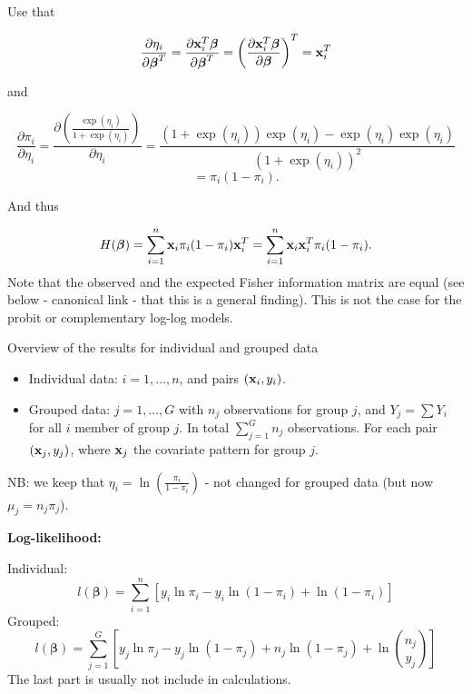 \documentclass[
  ignorenonframetext,
]{beamer}
\providecommand{\tightlist}{%
  \setlength{\itemsep}{0pt}\setlength{\parskip}{0pt}}
\begin{document}
\begin{frame}
Use that

\[ \frac{\partial \eta_i}{\partial \boldsymbol{\beta}^T}=\frac{\partial {\bf x}_i^T\boldsymbol{\beta}}{\partial \boldsymbol{\beta}^T} = \left(\frac{\partial {\bf x}_i^T\boldsymbol{\beta}}{\partial \boldsymbol{\beta}}\right)^T = {\bf x}_i^T \]

and

\[ \frac{\partial \pi_i}{\partial \eta_i} =  \frac{\partial\left(\frac{\exp(\eta_i)}{1+\exp(\eta_i)}\right)}{\partial \eta_i} = \frac{(1+\exp(\eta_i))\exp(\eta_i) - \exp(\eta_i)\exp(\eta_i)}{(1+\exp(\eta_i))^2} \]
\[=\pi_i (1-\pi_i).\]
\end{frame}

\begin{frame}
And thus

\[H(\boldsymbol{\beta}) =\sum_{i=1}^n {\bf x}_i\pi_i(1-\pi_i) {\bf x}_i^T = \sum_{i=1}^n {\bf x}_i{\bf x}_i^T \pi_i(1-\pi_i).\]
Note that the observed and the expected Fisher information matrix are
equal (see below - canonical link - that this is a general finding).
This is not the case for the probit or complementary log-log models.
\end{frame}

\begin{frame}
\begin{block}{Overview of the results for individual and grouped data}
\protect\hypertarget{overview-of-the-results-for-individual-and-grouped-data}{}
\begin{itemize}
\tightlist
\item
  Individual data: \(i=1,\ldots, n\), and pairs \(({\bf x}_i,y_i)\).
\item
  Grouped data: \(j=1,\ldots, G\) with \(n_j\) observations for group
  \(j\), and \(Y_j=\sum Y_i\) for all \(i\) member of group \(j\). In
  total \(\sum_{j=1}^G n_j\) observations. For each pair
  \(({\bf x}_j, y_j)\), where \({\bf x}_j\) the covariate pattern for
  group \(j\).
\end{itemize}

NB: we keep that \(\eta_i=\ln (\frac{\pi_i}{1-\pi_i})\) - not changed
for grouped data (but now \(\mu_j=n_j\pi_j\)).
\end{block}
\end{frame}

\begin{frame}
\textbf{Log-likelihood:}

Individual:
\[l(\boldsymbol{\beta})=\sum_{i=1}^n[y_i \ln \pi_i-y_i\ln(1-\pi_i)+\ln(1-\pi_i)]\]
Grouped:
\[l(\boldsymbol{\beta})=\sum_{j=1}^G[y_j \ln \pi_j-y_j\ln(1-\pi_j)+n_j\ln(1-\pi_j)+ \ln {n_j \choose y_j}]\]
The last part is usually not include in calculations.
\end{frame}
\end{document}
